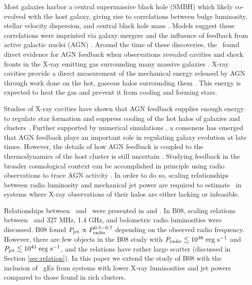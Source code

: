 \documentclass[12pt, preprint]{aastex}
\begin{document}
Most galaxies harbor a central supermassive black hole (SMBH) which
likely co-evolved with the host galaxy, giving rise to correlations
between bulge luminosity, stellar velocity dispersion, and central
black hole mass \citep{1995ARA&A..33..581K, magorrian}. Models suggest
these correlations were imprinted via galaxy mergers and the influence
of feedback from active galactic nuclei (AGN)
\citep[\eg][]{1998A&A...331L...1S, 2000MNRAS.311..576K}. Around the
time of these discoveries, the \cxo\ found direct evidence for AGN
feedback when observations revealed cavities and shock fronts in the
X-ray emitting gas surrounding many massive galaxies
\citep[\eg][]{perseus1, 2000ApJ...534L.135M}. X-ray cavities provide a
direct measurement of the mechanical energy released by AGN through
work done on the hot, gaseous halos surrounding them
\citep{2000ApJ...534L.135M}. This energy is expected to heat the gas
\citep{2001ApJ...554..261C} and prevent it from cooling and forming
stars.

Studies of X-ray cavities have shown that AGN feedback supplies enough
energy to regulate star formation and suppress cooling of the hot
halos of galaxies and clusters \citep{birzan04, 2005MNRAS.364.1343D,
  rafferty06}. Further supported by numerical simulations
\citep[\eg][]{croton06, bower06}, a consensus has emerged that AGN
feedback plays an important role in regulating galaxy evolution at
late times. However, the details of how AGN feedback is coupled to the
thermodynamics of the host cluster is still uncertain
\citep{2008ASPC..386..343D, 2009arXiv0910.3691M}. Studying feedback in
the broader cosmological context can be accomplished in principle
using radio observations to trace AGN activity
\citep[\eg][]{best07}. In order to do so, scaling relationships
between radio luminosity and mechanical jet power are required to
estimate \pjet\ in systems where X-ray observations of their halos are
either lacking or infeasible.

Relationships between \pjet\ and \prad\ were presented in
\citet[][hereafter B04]{birzan04} and \citet[][hereafter
  B08]{birzan08}. In B08, scaling relations between \pjet\ and 327
MHz, 1.4 GHz, and bolometric radio luminosities were discussed. B08
found $P_{\rm{jet}} \propto P_{\rm{radio}}^{0.5-0.7}$ depending on the observed radio
frequency. However, there are few objects in the B08 study with $P_{\rm{radio}}
\lesssim 10^{38} ~\rm{\mbox{\ensuremath{\rm{erg}}}~\ensuremath{\rm{\mbox{\ensuremath{\rm{s}}}^{-1}}}}$ and $P_{\rm{jet}} \lesssim 10^{43} ~\rm{\mbox{\ensuremath{\rm{erg}}}~\ensuremath{\rm{\mbox{\ensuremath{\rm{s}}}^{-1}}}}$, and the
relations have rather large scatter (discussed in Section
\ref{sec:relation}). In this paper we extend the study of B08 with the
inclusion of \samp\ gEs from systems with lower X-ray luminosities and
jet powers compared to those found in rich clusters.
\end{document}
